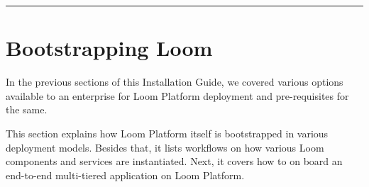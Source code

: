 \documentclass[letterpaper,10pt,english]{sphinxmanual}
\begin{document}
\bigskip\hrule\bigskip



\chapter{Bootstrapping Loom}
\label{\detokenize{loom_installation_guide:bootstrapping-loom}}
In the previous sections of this Installation Guide, we covered various options available to an enterprise for Loom Platform deployment and pre-requisites for the same.

This section explains how Loom Platform itself is bootstrapped in various deployment models. Besides that, it lists workflows on how various Loom components and services are instantiated. Next, it covers how to on board an end-to-end multi-tiered application on Loom Platform.
\end{document}

